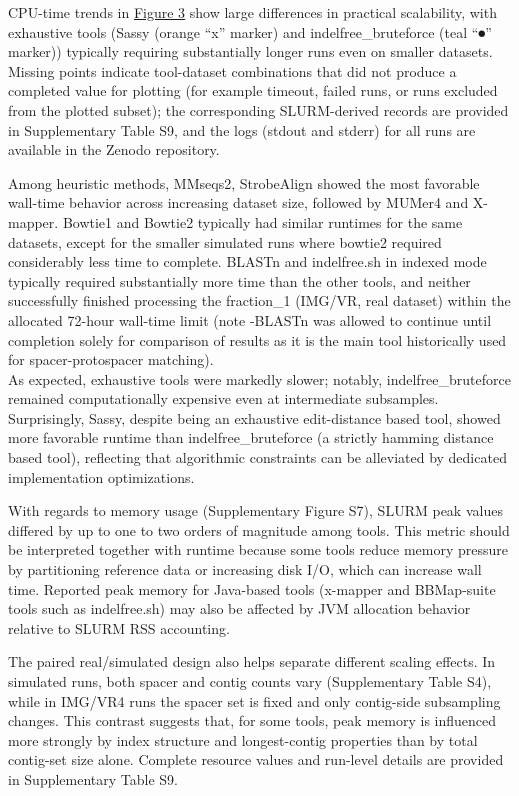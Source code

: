 \documentclass[
]{article}
\begin{document}
CPU-time trends in \hyperref[fig-resource-usage]{Figure 3} show large
differences in practical scalability, with exhaustive tools (Sassy
(orange ``x'' marker) and indelfree\_bruteforce (teal ``⏺'' marker))
typically requiring substantially longer runs even on smaller datasets.
Missing points indicate tool-dataset combinations that did not produce a
completed value for plotting (for example timeout, failed runs, or runs
excluded from the plotted subset); the corresponding SLURM-derived
records are provided in Supplementary Table S9, and the logs (stdout and
stderr) for all runs are available in the Zenodo repository.

Among heuristic methods, MMseqs2, StrobeAlign showed the most favorable
wall-time behavior across increasing dataset size, followed by MUMer4
and X-mapper. Bowtie1 and Bowtie2 typically had similar runtimes for the
same datasets, except for the smaller simulated runs where bowtie2
required considerably less time to complete. BLASTn and indelfree.sh in
indexed mode typically required substantially more time than the other
tools, and neither successfully finished processing the fraction\_1
(IMG/VR, real dataset) within the allocated 72-hour wall-time limit
(note -BLASTn was allowed to continue until completion solely for
comparison of results as it is the main tool historically used for
spacer-protospacer matching).\\
As expected, exhaustive tools were markedly slower; notably,
indelfree\_bruteforce remained computationally expensive even at
intermediate subsamples. Surprisingly, Sassy, despite being an
exhaustive edit-distance based tool, showed more favorable runtime than
indelfree\_bruteforce (a strictly hamming distance based tool),
reflecting that algorithmic constraints can be alleviated by dedicated
implementation optimizations.

With regards to memory usage (Supplementary Figure S7), SLURM peak
values differed by up to one to two orders of magnitude among tools.
This metric should be interpreted together with runtime because some
tools reduce memory pressure by partitioning reference data or
increasing disk I/O, which can increase wall time. Reported peak memory
for Java-based tools (x-mapper and BBMap-suite tools such as
indelfree.sh) may also be affected by JVM allocation behavior relative
to SLURM RSS accounting.

The paired real/simulated design also helps separate different scaling
effects. In simulated runs, both spacer and contig counts vary
(Supplementary Table S4), while in IMG/VR4 runs the spacer set is fixed
and only contig-side subsampling changes. This contrast suggests that,
for some tools, peak memory is influenced more strongly by index
structure and longest-contig properties than by total contig-set size
alone. Complete resource values and run-level details are provided in
Supplementary Table S9.
\end{document}
